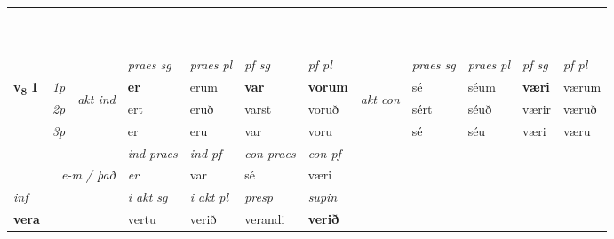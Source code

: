 \begin{longtable}[l]{X>{\footnotesize\itshape}llXXXXlXXXX}
\midrule
& \\*
   & \\*
   & \\*
  & \\*
   & \\*
   & \\*
   & \\*
  & \\*
   & \\*
  & \\
   \midrule
 & &   & \textit{praes sg}  & \textit{praes pl}    & \textit{ pf sg} & \textit{pf pl} & & \textit{praes sg}  & \textit{praes pl}    & \textit{pf sg} & \textit{pf pl }  \\ \cmidrule{4-7} \cmidrule{9-12}
 \multirow{2}{*}{{{\textbf{v{\textsubscript{8}}} \Large{\textbf{1}}}}}  & 1p & \multirow{3}{*}{\begin{turn}{90}\textit{akt ind}\end{turn}} & \textbf{er} & erum & \textbf{var} & \textbf{vorum} & \multirow{3}{*}{\begin{turn}{90}\textit{akt con}\end{turn}} &sé & séum & \textbf{væri} & værum\\*
 & 2p &  &  ert  & eruð & varst & voruð & & sért & séuð & værir & væruð \\*
 & 3p &  & er & eru & var & voru & & sé & séu& væri & væru \\*
\cmidrule{4-7} \cmidrule{9-12}

   && &  \textit{ind praes} & \textit{ind pf} & \textit{con praes} & \textit{con pf} \\*
\multicolumn{3}{r}{\textit{e-m / það}} & er & var & sé & væri \\*

\cmidrule{4-7}
   {\textit{inf}} & &  & \textit{i akt sg} & \textit{i akt pl}   & \textit{presp} & \textit{supin}   \\*
  {\textbf{vera}} & && vertu  & verið   & verandi &  \textbf{verið}   \\*

\midrule


\end{longtable}
